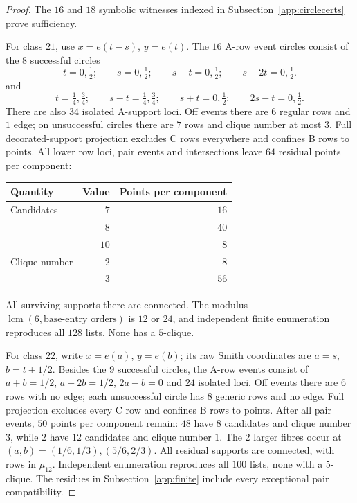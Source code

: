 \documentclass[11pt,a4paper]{article}
\theoremstyle{plain}
\theoremstyle{definition}
\numberwithin{equation}{section}
\begin{document}
\begin{proof}
The $16$ and $18$ symbolic witnesses indexed in Subsection~\ref{app:circlecerts} prove sufficiency.

For class $21$, use $x=e(t-s)$, $y=e(t)$. The $16$ A-row event circles consist of the $8$ successful circles
$$
t=0,\tfrac{1}{2};\qquad s=0,\tfrac{1}{2};\qquad
s-t=0,\tfrac{1}{2};\qquad s-2t=0,\tfrac{1}{2}.
$$
and
$$
t=\tfrac14,\tfrac34;\qquad s-t=\tfrac14,\tfrac34;\qquad
s+t=0,\tfrac{1}{2};\qquad2s-t=0,\tfrac{1}{2}.
$$
There are also $34$ isolated A-support loci. Off events there are $6$ regular rows and $1$ edge; on unsuccessful circles there are $7$ rows and clique number at most $3$. Full decorated-support projection excludes C rows everywhere and confines B rows to points. All lower row loci, pair events and intersections leave $64$ residual points per component:
\begin{center}\begin{tabular}{lrr}\toprule
Quantity&Value&Points per component\\\midrule
Candidates&$7$&$16$\\&$8$&$40$\\&$10$&$8$\\\midrule
Clique number&$2$&$8$\\&$3$&$56$\\\bottomrule
\end{tabular}\end{center}
All surviving supports there are connected. The modulus $\operatorname{lcm}(6,\text{base-entry orders})$ is $12$ or $24$, and independent finite enumeration reproduces all $128$ lists. None has a $5$-clique.

For class $22$, write $x=e(a)$, $y=e(b)$; its raw Smith coordinates are $a=s$, $b=t+1/2$. Besides the $9$ successful circles, the A-row events consist of $a+b=1/2$, $a-2b=1/2$, $2a-b=0$ and $24$ isolated loci. Off events there are $6$ rows with no edge; each unsuccessful circle has $8$ generic rows and no edge. Full projection excludes every C row and confines B rows to points. After all pair events, $50$ points per component remain: $48$ have $8$ candidates and clique number $3$, while $2$ have $12$ candidates and clique number $1$.
The $2$ larger fibres occur at $(a,b)=(1/6,1/3),(5/6,2/3)$. All residual supports are connected, with rows in $\mu_{12}$. Independent enumeration reproduces all $100$ lists, none with a $5$-clique. The residues in Subsection~\ref{app:finite} include every exceptional pair compatibility.
\end{proof}
\end{document}

